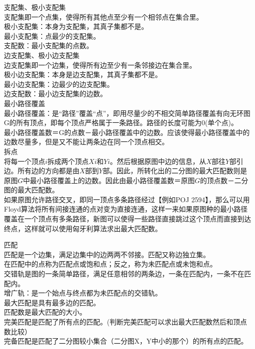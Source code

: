 支配集、极小支配集 \\
支配集即一个点集，使得所有其他点至少有一个相邻点在集合里。 \\
极小支配集：本身为支配集，其真子集都不是。 \\
最小支配集：点最少的支配集。 \\
支配数：最小支配集的点数。\\

边支配集、极小边支配集 \\
边支配集即一个边集，使得所有边至少有一条邻接边在集合里。 \\
极小边支配集：本身是边支配集，其真子集都不是。 \\
最小边支配集：边最少的边支配集。 \\
边支配数：最小边支配集的边数。 \\

最小路径覆盖 \\
最小路径覆盖：是“路径”覆盖“点”，即用尽量少的不相交简单路径覆盖有向无环图G的所有顶点，即每个顶点严格属于一条路径。路径的长度可能为0(单个点)。 \\
最小路径覆盖数＝G的点数－最小路径覆盖中的边数。应该使得最小路径覆盖中的边数尽量多，但是又不能让两条边在同一个顶点相交。  \\

拆点 \\
将每一个顶点$i$拆成两个顶点$Xi$和$Yi$。然后根据原图中边的信息，从$X$部往$Y$部引边。所有边的方向都是由$X$部到$Y$部。因此，所转化出的二分图的最大匹配数则是原图$G$中最小路径覆盖上的边数。因此由最小路径覆盖数＝原图$G$的顶点数－二分图的最大匹配数。\\
如果原图允许路径交叉，即同一顶点多条路径经过【例如POJ 2594】，那么可以用Floyd算法将所有间接连通的点对变为直接连通，这样一来如果原图种的最小路径覆盖在一个顶点有多条路径，新图可以使得一些路径直接跳过这个顶点而直接到达终点，这样就可以使用匈牙利算法求出最大匹配数。

匹配 \\
匹配是一个边集，满足边集中的边两两不邻接。匹配又称边独立集。\\
在匹配中的点称为匹配点或饱和点；反之，称为未匹配点或未饱和点。 \\
交错轨是图的一条简单路径，满足任意相邻的两条边，一条在匹配内，一条不在匹配内。 \\
增广轨：是一个始点与终点都为未匹配点的交错轨。 \\
最大匹配是具有最多边的匹配。 \\
匹配数是最大匹配的大小。\\
完美匹配是匹配了所有点的匹配。(判断完美匹配可以求出最大匹配数然后和顶点数比较） \\
完备匹配是匹配了二分图较小集合（二分图X，Y中小的那个）的所有点的匹配。 \\

